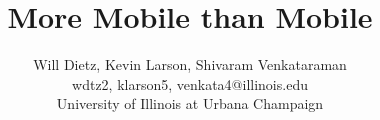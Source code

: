 \documentclass[letterpaper,twocolumn,10pt]{article}
\title{More Mobile than Mobile}
\author{Will Dietz, Kevin Larson, Shivaram Venkataraman\\
wdtz2, klarson5, venkata4@illinois.edu\\
University of Illinois at Urbana Champaign}
\date{}
\begin{document}
\maketitle

%

\label{sec:intro}

\label{sec:timeline}

\label{sec:eval}

\label{sec:results}



\end{document}
